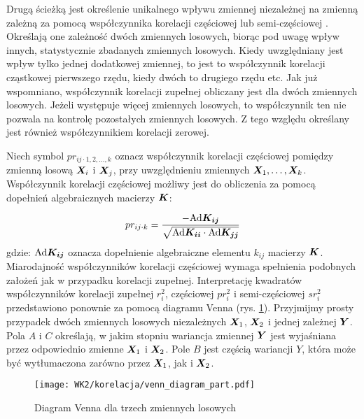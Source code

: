 \begin{appendices}
Drugą ścieżką jest określenie unikalnego wpływu zmiennej niezależnej na zmienną zależną za pomocą współczynnika korelacji częściowej  lub semi-częściowej . Określają one zależność dwóch zmiennych losowych, biorąc pod uwagę wpływ innych, statystycznie zbadanych zmiennych losowych. Kiedy uwzględniany jest wpływ tylko jednej dodatkowej zmiennej, to jest to współczynnik korelacji cząstkowej pierwszego rzędu, kiedy dwóch to drugiego rzędu etc. Jak już wspomniano, współczynnik korelacji zupełnej obliczany jest dla dwóch zmiennych losowych. Jeżeli występuje więcej zmiennych losowych, to współczynnik ten nie pozwala na kontrolę pozostałych zmiennych losowych. Z tego względu określany jest również współczynnikiem korelacji zerowej. 

Niech symbol $pr_{ij\cdot 1,2,\dots,k}$ oznacz współczynnik korelacji częściowej pomiędzy zmienną losową $\bm{X}_i$ i $\bm{X}_j$, przy uwzględnieniu zmiennych $\bm{X}_1,\dots,\bm{X}_k$. Współczynnik korelacji częściowej możliwy jest do obliczenia za pomocą dopełnień algebraicznych macierzy $\bm{K}$:

\begin{equation}
		pr_{ij\cdot k} = \frac{-\mathrm{Ad}\bm{K_{ij}}}{\sqrt{\mathrm{Ad}\bm{K_{ii}}\cdot\mathrm{Ad}\bm{K_{jj}}}}
\end{equation}
gdzie: $\mathrm{Ad}\bm{K_{ij}}$ oznacza dopełnienie algebraiczne elementu $k_{ij}$ macierzy $\bm{K}$. Miarodajność współczynników korelacji częściowej wymaga spełnienia podobnych założeń jak w przypadku korelacji zupełnej.
\clearpage
Interpretację kwadratów współczynników korelacji zupełnej $r_i^2$, częściowej $pr_i^2$ i semi-częściowej $sr_i^2$ przedstawiono ponownie za pomocą diagramu Venna (rys. \ref{fig:venn_diag_part_corr}). Przyjmijmy prosty przypadek dwóch zmiennych losowych niezależnych $\bm{X}_1$, $\bm{X}_2$ i jednej zależnej $\bm{Y}$. Pola $A$ i $C$ określają, w jakim stopniu wariancja zmiennej $\bm{Y}$ jest wyjaśniana przez odpowiednio zmienne $\bm{X}_1$ i $\bm{X}_2$. Pole $B$ jest częścią wariancji $Y$, która może być wytłumaczona zarówno przez $\bm{X}_1$, jak i $\bm{X}_2$.

\begin{figure}[hbt!]
	\centering
	\texttt{[image: WK2/korelacja/venn\_diagram\_part.pdf]}
	\captionsetup{justification=centering}
	\caption{Diagram Venna dla trzech zmiennych losowych}
	\label{fig:venn_diag_part_corr}
\end{figure}


\end{appendices}

